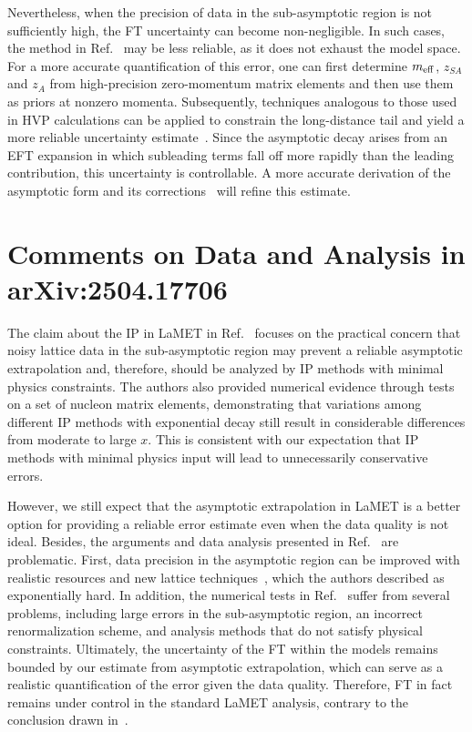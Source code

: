 \documentclass[prd,twocolumn,superscriptaddress,preprintnumbers,showpacs,nofootinbib,notitlepage,floatfix]{revtex4-2}
\begin{document}
Nevertheless, when the precision of data in the sub-asymptotic region is not sufficiently high, the FT uncertainty can become non-negligible. In such cases, the method in Ref.~\cite{Gao:2021dbh} may be less reliable, as it does not exhaust the model space. For a more accurate quantification of this error, one can first determine $m_{\rm eff}$, $z_{SA}$ and $z_A$ from high-precision zero-momentum matrix elements and then use them as priors at nonzero momenta. Subsequently, techniques analogous to those used in HVP calculations can be applied to constrain the long-distance tail and yield a more reliable uncertainty estimate~\cite{Ji:2026vir}. Since the asymptotic decay arises from an EFT expansion in which subleading terms fall off more rapidly than the leading contribution, this uncertainty is controllable. A more accurate derivation of the asymptotic form and its corrections~\cite{Ji:2026vir} will refine this estimate.

\section{Comments on Data and Analysis in arXiv:2504.17706}
\label{sec:response}

The claim about the IP in LaMET in Ref.~\cite{Dutrieux:2025jed} focuses on the practical concern that noisy lattice data in the sub-asymptotic region may prevent a reliable asymptotic extrapolation and, therefore, should be analyzed by IP methods with minimal physics constraints. The authors also provided numerical evidence through tests on a set of nucleon matrix elements, demonstrating that variations among different IP methods with exponential decay still result in considerable differences from moderate to large $x$. This is consistent with our expectation that IP methods with minimal physics input will lead to unnecessarily conservative errors. 

However, we still expect that the asymptotic extrapolation in LaMET is a better option for providing a reliable error estimate even when the data quality is not ideal. Besides, the arguments and data analysis presented in Ref.~\cite{Dutrieux:2025jed} are problematic. First, data precision in the asymptotic region can be improved with realistic resources and new lattice techniques~\cite{Zhang:2025hyo,Wagman:2024rid,Hackett:2024nbe,Gao:2023lny,Zhao:2023ptv}, which the authors described as exponentially hard. In addition, the numerical tests in Ref.~\cite{Dutrieux:2025jed} suffer from several problems, including large errors in the sub-asymptotic region, an incorrect renormalization scheme, and analysis methods that do not satisfy physical constraints. Ultimately, the uncertainty of the FT within the models remains bounded by our estimate from asymptotic extrapolation, which can serve as a realistic quantification of the error given the data quality. Therefore, FT in fact remains under control in the standard LaMET analysis, contrary to the conclusion drawn in~\cite{Dutrieux:2025jed}.
\end{document}

